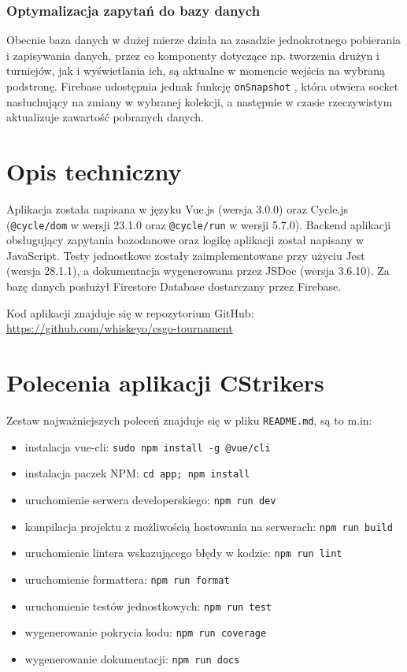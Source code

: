 \documentclass[shortabstract]{iithesis}
\theoremstyle{definition} \newtheorem{definition}{Definicja}[]
\theoremstyle{remark} \newtheorem{remark}[definition]{Observation}
\theoremstyle{plain} \newtheorem{theorem}[definition]{Theorem}
\theoremstyle{plain} \newtheorem{lemma}[definition]{Lemma}
\begin{document}
\subsection{Optymalizacja zapytań do bazy danych}
Obecnie baza danych w dużej mierze działa na zasadzie jednokrotnego pobierania i zapisywania danych, przez co komponenty dotyczące np. tworzenia drużyn i turniejów, jak i wyświetlania ich, są aktualne w momencie wejścia na wybraną podstronę. Firebase udostępnia jednak funkcję \texttt{onSnapshot} \cite{bib:firebase-on-snapshot}, która otwiera socket nasłuchujący na zmiany w wybranej kolekcji, a następnie w czasie rzeczywistym aktualizuje zawartość pobranych danych.

\chapter{Opis techniczny}
Aplikacja została napisana w języku Vue.js (wersja 3.0.0) oraz Cycle.js (\texttt{@cycle/dom} w wersji 23.1.0 oraz \texttt{@cycle/run} w wersji 5.7.0). Backend aplikacji obsługujący zapytania bazodanowe oraz logikę aplikacji został napisany w JavaScript. Testy jednostkowe zostały zaimplementowane przy użyciu Jest (wersja 28.1.1), a dokumentacja wygenerowana przez JSDoc (wersja 3.6.10). Za bazę danych posłużył Firestore Database dostarczany przez Firebase.

Kod aplikacji znajduje się w repozytorium GitHub:\newline
\url{https://github.com/whiskeyo/csgo-tournament}

\chapter{Polecenia aplikacji CStrikers}
Zestaw najważniejszych poleceń znajduje się w pliku \texttt{README.md}, są to m.in:
\begin{itemize}
    \item instalacja vue-cli: \texttt{sudo npm install -g @vue/cli}
    \item instalacja paczek NPM: \texttt{cd app; npm install}
    \item uruchomienie serwera developerskiego: \texttt{npm run dev}
    \item kompilacja projektu z możliwością hostowania na serwerach: \texttt{npm run build}
    \item uruchomienie lintera wskazującego błędy w kodzie: \texttt{npm run lint}
    \item uruchomienie formattera: \texttt{npm run format}
    \item uruchomienie testów jednostkowych: \texttt{npm run test}
    \item wygenerowanie pokrycia kodu: \texttt{npm run coverage}
    \item wygenerowanie dokumentacji: \texttt{npm run docs}
\end{itemize}
\end{document}
